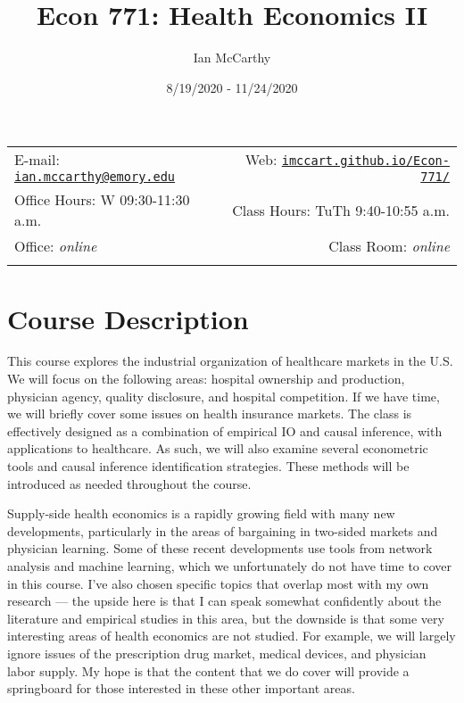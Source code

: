 \documentclass[11pt,]{article}
\title{Econ 771: Health Economics II}
\author{Ian McCarthy}
\date{8/19/2020 - 11/24/2020}
\begin{document}
  

		\maketitle
		
	
		\thispagestyle{firststyle}



	\noindent \begin{tabular*}{\textwidth}{ @{\extracolsep{\fill}} lr @{\extracolsep{\fill}}}


E-mail: \texttt{\href{mailto:ian.mccarthy@emory.edu}{\nolinkurl{ian.mccarthy@emory.edu}}} & Web: \href{http://imccart.github.io/Econ-771/}{\tt imccart.github.io/Econ-771/}\\
Office Hours: W 09:30-11:30 a.m.  &  Class Hours: TuTh 9:40-10:55 a.m.\\
Office: \emph{online}  & Class Room: \emph{online}\\
	&  \\
	\hline
	\end{tabular*}
	
\vspace{2mm}
	


\hypertarget{course-description}{%
\section{Course Description}\label{course-description}}

This course explores the industrial organization of healthcare markets
in the U.S. We will focus on the following areas: hospital ownership and
production, physician agency, quality disclosure, and hospital
competition. If we have time, we will briefly cover some issues on
health insurance markets. The class is effectively designed as a
combination of empirical IO and causal inference, with applications to
healthcare. As such, we will also examine several econometric tools and
causal inference identification strategies. These methods will be
introduced as needed throughout the course.

Supply-side health economics is a rapidly growing field with many new
developments, particularly in the areas of bargaining in two-sided
markets and physician learning. Some of these recent developments use
tools from network analysis and machine learning, which we unfortunately
do not have time to cover in this course. I've also chosen specific
topics that overlap most with my own research --- the upside here is
that I can speak somewhat confidently about the literature and empirical
studies in this area, but the downside is that some very interesting
areas of health economics are not studied. For example, we will largely
ignore issues of the prescription drug market, medical devices, and
physician labor supply. My hope is that the content that we do cover
will provide a springboard for those interested in these other important
areas.
\end{document}
